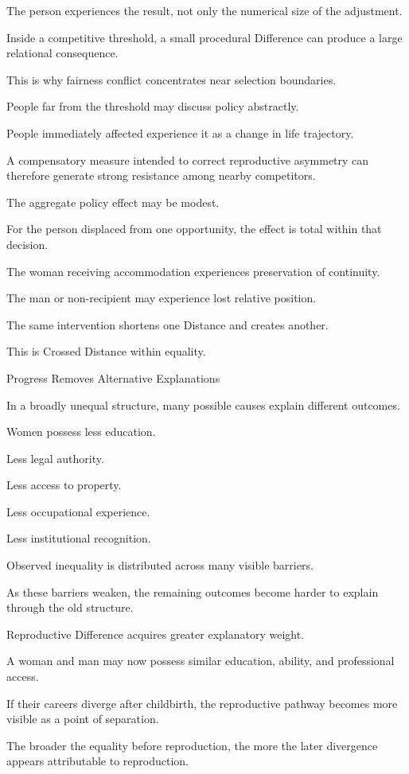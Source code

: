 The person experiences the result, not only the numerical size of the adjustment.

Inside a competitive threshold, a small procedural Difference can produce a large relational consequence.

This is why fairness conflict concentrates near selection boundaries.

People far from the threshold may discuss policy abstractly.

People immediately affected experience it as a change in life trajectory.

A compensatory measure intended to correct reproductive asymmetry can therefore generate strong resistance among nearby competitors.

The aggregate policy effect may be modest.

For the person displaced from one opportunity, the effect is total within that decision.

The woman receiving accommodation experiences preservation of continuity.

The man or non-recipient may experience lost relative position.

The same intervention shortens one Distance and creates another.

This is Crossed Distance within equality.

Progress Removes Alternative Explanations

In a broadly unequal structure, many possible causes explain different outcomes.

Women possess less education.

Less legal authority.

Less access to property.

Less occupational experience.

Less institutional recognition.

Observed inequality is distributed across many visible barriers.

As these barriers weaken, the remaining outcomes become harder to explain through the old structure.

Reproductive Difference acquires greater explanatory weight.

A woman and man may now possess similar education, ability, and professional access.

If their careers diverge after childbirth, the reproductive pathway becomes more visible as a point of separation.

The broader the equality before reproduction, the more the later divergence appears attributable to reproduction.


